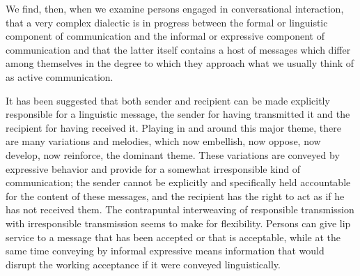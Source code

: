 \documentclass[twoside,symmetric,nobib,justified]{tufte-book}
\begin{document}
We find, then, when we examine persons engaged in con­versational
interaction, that a very complex dialectic is in progress between the
formal or linguistic component of communication and the informal or
expressive component of communication and that the latter itself
contains a host of messages which differ among themselves in the degree
to which they approach what we usually think of as active communication.

It has been suggested that both sender and recipient can be made
explicitly responsible for a linguistic message, the sender for having
transmitted it and the recipient for having received it. Playing in and
around this major theme, there are many variations and melodies, which
now embellish, now oppose, now develop, now reinforce, the dominant
theme. These varia­tions are conveyed by expressive behavior and provide
for a some­what irresponsible kind of communication; the sender cannot be
explicitly and specifically held accountable for the content of these
messages, and the recipient has the right to act as if he has not
received them. The contrapuntal interweaving of responsible transmission
with irresponsible transmission seems to make for flexibility. Persons
can give lip service to a message that has been accepted or that is
acceptable, while at the same time conveying by informal expressive
means information that would disrupt the working acceptance if it were
conveyed lin­guistically.
\end{document}
